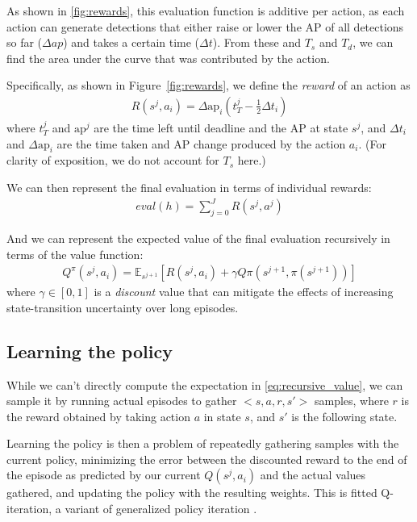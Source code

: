 As shown in \autoref{fig:rewards}, this evaluation function is additive per action, as each action can generate detections that either raise or lower the AP of all detections so far ($\Delta ap$) and takes a certain time ($\Delta t$).
From these and $T_s$ and $T_d$, we can find the area under the curve that was contributed by the action.

Specifically, as shown in Figure~\ref{fig:rewards}, we define the \emph{reward} of an action as
\begin{align}\label{eq:advanced}
R(s^j,a_i) = \Delta \text{ap}_i (t_T^j-\frac{1}{2}\Delta t_i)
\end{align}
where $t_T^j$ and $\text{ap}^j$ are the time left until deadline and the AP at state $s^j$, and $\Delta t_i$ and $\Delta \text{ap}_i$ are the time taken and AP change produced by the action $a_i$.
(For clarity of exposition, we do not account for $T_s$ here.)

We can then represent the final evaluation in terms of individual rewards:
\begin{align}
eval(h) = \sum_{j=0}^J R(s^j,a^j)
\end{align}

And we can represent the expected value of the final evaluation recursively in terms of the value function:
\begin{align} \label{eq:recursive_value}
Q^\pi(s^j,a_i) = \mathbb{E}_{s^{j+1}} [R(s^j,a_i) + \gamma Q\pi(s^{j+1},\pi(s^{j+1}))]
\end{align}
where $\gamma \in [0,1]$ is a \emph{discount} value that can mitigate the effects of increasing state-transition uncertainty over long episodes.

\subsection{Learning the policy}
While we can't directly compute the expectation in \eqref{eq:recursive_value}, we can sample it by running actual episodes to gather $<s,a,r,s'>$ samples, where $r$ is the reward obtained by taking action $a$ in state $s$, and $s'$ is the following state.

Learning the policy is then a problem of repeatedly gathering samples with the current policy, minimizing the error between the discounted reward to the end of the episode as predicted by our current $Q(s^j,a_i)$ and the actual values gathered, and updating the policy with the resulting weights.
This is fitted Q-iteration, a variant of generalized policy iteration \cite{Ernst2005,Sutton1998}.

